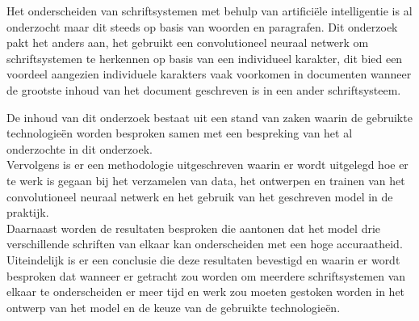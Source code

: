 Het onderscheiden van schriftsystemen met behulp van artificiële intelligentie is al onderzocht maar dit steeds op basis van woorden en paragrafen.
Dit onderzoek pakt het anders aan, het gebruikt een convolutioneel neuraal netwerk om schriftsystemen te herkennen op basis van een individueel karakter, dit bied een voordeel aangezien individuele karakters vaak voorkomen in documenten wanneer de grootste inhoud van het document geschreven is in een ander schriftsysteem.

De inhoud van dit onderzoek bestaat uit een stand van zaken waarin de gebruikte technologieën worden besproken samen met een bespreking van het al onderzochte in dit onderzoek. \\
Vervolgens is er een methodologie uitgeschreven waarin er wordt uitgelegd hoe er te werk is gegaan bij het verzamelen van data, het ontwerpen en trainen van het convolutioneel neuraal netwerk en het gebruik van het geschreven model in de praktijk. \\
Daarnaast worden de resultaten besproken die aantonen dat het model drie verschillende schriften van elkaar kan onderscheiden met een hoge accuraatheid. \\
Uiteindelijk is er een conclusie die deze resultaten bevestigd en waarin er wordt besproken dat wanneer er getracht zou worden om meerdere schriftsystemen van elkaar te onderscheiden er meer tijd en werk zou moeten gestoken worden in het ontwerp van het model en de keuze van de gebruikte technologieën.